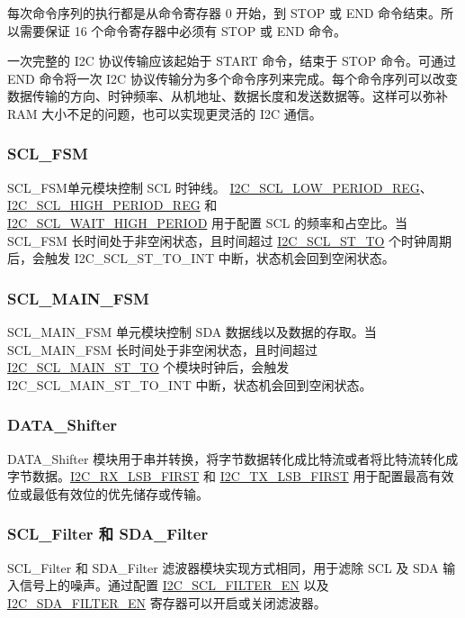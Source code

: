 \documentclass[main\_\_CN.tex]{subfiles}
\begin{document}
每次命令序列的执行都是从命令寄存器 0 开始，到 STOP 或 END 命令结束。所以需要保证 16 个命令寄存器中必须有 STOP 或 END 命令。

一次完整的 I2C 协议传输应该起始于 START 命令，结束于 STOP 命令。可通过 END 命令将一次 I2C 协议传输分为多个命令序列来完成。每个命令序列可以改变数据传输的方向、时钟频率、从机地址、数据长度和发送数据等。这样可以弥补 RAM 大小不足的问题，也可以实现更灵活的 I2C 通信。

\subsubsection{SCL\_FSM}
SCL\_FSM单元模块控制 SCL 时钟线。 \hyperref[regdesc:I2CSCLLOWPERIODREG]{I2C\_SCL\_LOW\_PERIOD\_REG}、\hyperref[regdesc:I2CSCLHIGHPERIODREG]{I2C\_SCL\_HIGH\_PERIOD\_REG} 和\\ \hyperref[fielddesc:I2CSCLWAITHIGHPERIOD]{I2C\_SCL\_WAIT\_HIGH\_PERIOD} 用于配置 SCL 的频率和占空比。当 SCL\_FSM 长时间处于非空闲状态，且时间超过 \hyperref[fielddesc:I2CSCLSTTO]{I2C\_SCL\_ST\_TO} 个时钟周期后，会触发 I2C\_SCL\_ST\_TO\_INT 中断，状态机会回到空闲状态。

\subsubsection{SCL\_MAIN\_FSM}
SCL\_MAIN\_FSM 单元模块控制 SDA 数据线以及数据的存取。当 SCL\_MAIN\_FSM 长时间处于非空闲状态，且时间超过 \hyperref[fielddesc:I2CSCLMAINSTTO]{I2C\_SCL\_MAIN\_ST\_TO} 个模块时钟后，会触发 I2C\_SCL\_MAIN\_ST\_TO\_INT 中断，状态机会回到空闲状态。

\subsubsection{DATA\_Shifter}
DATA\_Shifter 模块用于串并转换，将字节数据转化成比特流或者将比特流转化成字节数据。\hyperref[fielddesc:I2CRXLSBFIRST]{I2C\_RX\_LSB\_FIRST} 和 \hyperref[fielddesc:I2CTXLSBFIRST]{I2C\_TX\_LSB\_FIRST} 用于配置最高有效位或最低有效位的优先储存或传输。

\subsubsection{SCL\_Filter 和 SDA\_Filter}
SCL\_Filter 和 SDA\_Filter 滤波器模块实现方式相同，用于滤除 SCL 及 SDA 输入信号上的噪声。通过配置 \hyperref[fielddesc:I2CSCLFILTEREN]{I2C\_SCL\_FILTER\_EN} 以及 \hyperref[fielddesc:I2CSDAFILTEREN]{I2C\_SDA\_FILTER\_EN} 寄存器可以开启或关闭滤波器。
\end{document}
